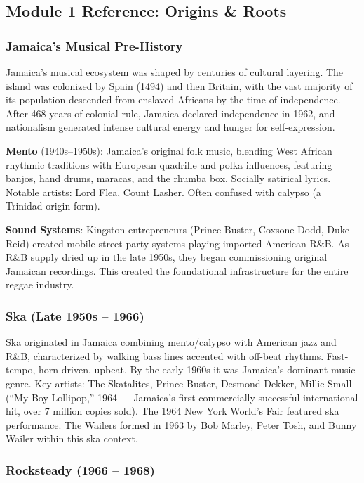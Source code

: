 \documentclass[11pt,letterpaper]{article}
\begin{document}
\subsection{Module 1 Reference: Origins \& Roots}

\subsubsection{Jamaica's Musical Pre-History}

Jamaica's musical ecosystem was shaped by centuries of cultural layering. The island was colonized by Spain (1494) and then Britain, with the vast majority of its population descended from enslaved Africans by the time of independence. After 468 years of colonial rule, Jamaica declared independence in 1962, and nationalism generated intense cultural energy and hunger for self-expression.

\textbf{Mento} (1940s--1950s): Jamaica's original folk music, blending West African rhythmic traditions with European quadrille and polka influences, featuring banjos, hand drums, maracas, and the rhumba box. Socially satirical lyrics. Notable artists: Lord Flea, Count Lasher. Often confused with calypso (a Trinidad-origin form).

\textbf{Sound Systems}: Kingston entrepreneurs (Prince Buster, Coxsone Dodd, Duke Reid) created mobile street party systems playing imported American R\&B. As R\&B supply dried up in the late 1950s, they began commissioning original Jamaican recordings. This created the foundational infrastructure for the entire reggae industry.

\subsubsection{Ska (Late 1950s -- 1966)}

Ska originated in Jamaica combining mento/calypso with American jazz and R\&B, characterized by walking bass lines accented with off-beat rhythms. Fast-tempo, horn-driven, upbeat. By the early 1960s it was Jamaica's dominant music genre. Key artists: The Skatalites, Prince Buster, Desmond Dekker, Millie Small (``My Boy Lollipop,'' 1964 --- Jamaica's first commercially successful international hit, over 7 million copies sold). The 1964 New York World's Fair featured ska performance. The Wailers formed in 1963 by Bob Marley, Peter Tosh, and Bunny Wailer within this ska context.

\subsubsection{Rocksteady (1966 -- 1968)}
\end{document}
